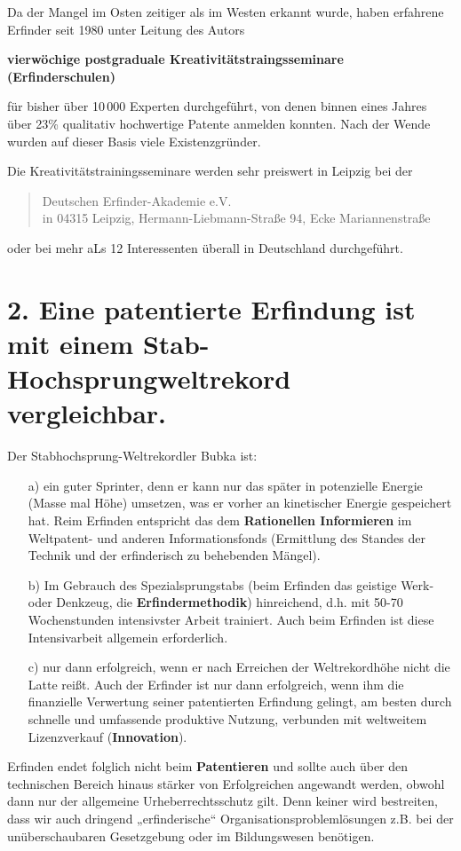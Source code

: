 \documentclass[11pt,a4paper]{article}
\begin{document}
Da der Mangel im Osten zeitiger als im Westen erkannt wurde, haben erfahrene
Erfinder seit 1980 unter Leitung des Autors
\begin{center}\bf
  vierwöchige postgraduale Kreativitätstraingsseminare (Erfinderschulen)
\end{center}
für bisher über 10\,000 Experten durchgeführt, von denen binnen eines Jahres
über 23\% qualitativ hochwertige Patente anmelden konnten. Nach der Wende
wurden auf dieser Basis viele Existenzgründer.

Die Kreativitätstrainingsseminare werden sehr preiswert in Leipzig bei der
\begin{quote}
  Deutschen Erfinder-Akademie e.V.\\
  in 04315 Leipzig, Hermann-Liebmann-Straße 94, Ecke Mariannenstraße 
\end{quote}
oder bei mehr aLs 12 Interessenten überall in Deutschland durchgeführt.

\section*{2. Eine patentierte Erfindung ist mit einem
  Stab-Hochsprung\-welt\-rekord vergleichbar.}

Der Stabhochsprung-Weltrekordler Bubka ist:
\begin{itemize}
\item[a)] ein guter Sprinter, denn er kann nur das später in potenzielle
  Energie (Masse mal Höhe) umsetzen, was er vorher an kinetischer Energie
  gespeichert hat.  Reim Erfinden entspricht das dem \textbf{Rationellen
    Informieren} im Weltpatent- und anderen Informationsfonds (Ermittlung des
  Standes der Technik und der erfinderisch zu behebenden Mängel).
\item[b)] Im Gebrauch des Spezialsprungstabs (beim Erfinden das geistige Werk-
  oder Denkzeug, die \textbf{Erfindermethodik}) hinreichend, d.h. mit 50-70
  Wochenstunden intensivster Arbeit trainiert.  Auch beim Erfinden ist diese
  Intensivarbeit allgemein erforderlich.
\item[c)] nur dann erfolgreich, wenn er nach Erreichen der Weltrekordhöhe
  nicht die Latte reißt. Auch der Erfinder ist nur dann erfolgreich, wenn ihm
  die finanzielle Verwertung seiner patentierten Erfindung gelingt, am besten
  durch schnelle und umfassende produktive Nutzung, verbunden mit weltweitem
  Lizenzverkauf (\textbf{Innovation}).
\end{itemize}
Erfinden endet folglich nicht beim \textbf{Patentieren} und sollte auch über
den technischen Bereich hinaus stärker von Erfolgreichen angewandt werden,
obwohl dann nur der allgemeine Urheberrechtsschutz gilt.  Denn keiner wird
bestreiten, dass wir auch dringend „erfinderische“
Organisationsproblemlösungen z.B. bei der unüberschaubaren Gesetzgebung oder im
Bildungswesen benötigen.
\end{document}
